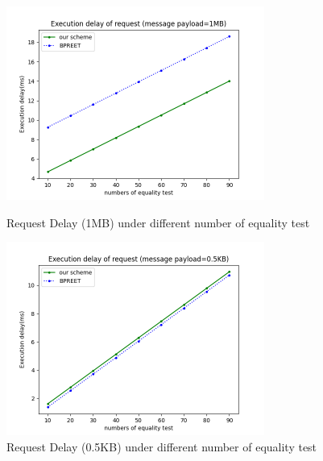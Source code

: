 \documentclass[journal,10pt]{IEEEtran}
\begin{document}
\begin{figure}
    \centering
    \includegraphics[width=240pt]{picture/Figure_1.png}
    \caption{Request Delay (1MB) under different number of equality test}
    \label{fig:et_1mb}
    
    \centering
    \includegraphics[width=240pt]{picture/Figure_2.png}
    \caption{Request Delay (0.5KB) under different number of equality test}
    \label{fig:et_0.5kb}
\end{figure}
\end{document}
